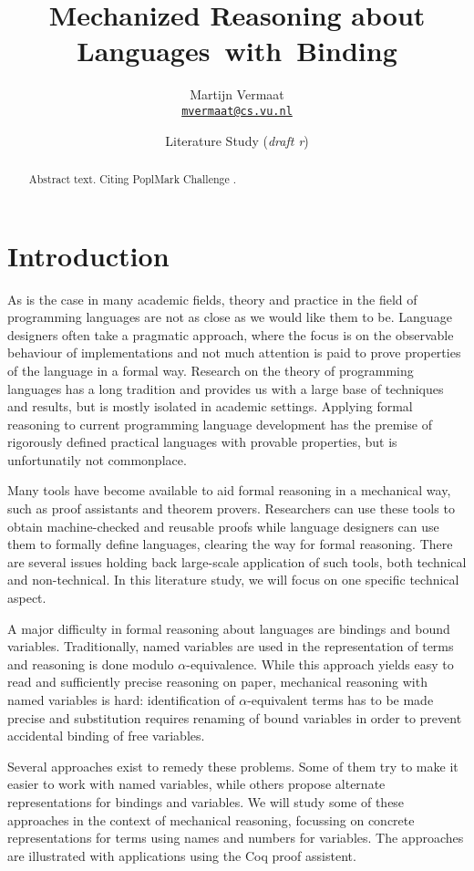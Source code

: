 \documentclass[a4paper,11pt]{article}
\title{Mechanized Reasoning about Languages~with~Binding}
\author{
  Martijn Vermaat\\[0.3em]
  \href{mailto:mvermaat@cs.vu.nl}{\texttt{mvermaat@cs.vu.nl}}
}
\date{Literature Study (\emph{draft r\svnrev})}
\begin{document}
\maketitle


\begin{abstract}
  Abstract text. Citing PoplMark Challenge \cite{Poplmark-Challenge-05}.
\end{abstract}


\section{Introduction}\label{sec:introduction}

As is the case in many academic fields, theory and practice in the field
of programming languages are not as close as we would like them to be.
Language designers often take a pragmatic approach, where the focus is
on the observable behaviour of implementations and not much attention
is paid to prove properties of the language in a formal way.
Research on the theory of programming languages has a long tradition and
provides us with a large base of techniques and results, but is mostly
isolated in academic settings.
Applying formal reasoning to current programming language development
has the premise of rigorously defined practical languages with provable
properties, but is unfortunatily not commonplace.

Many tools have become available to aid formal reasoning in a mechanical
way, such as proof assistants and theorem provers.
Researchers can use these tools to obtain machine-checked and reusable
proofs while language designers can use them to formally define languages,
clearing the way for formal reasoning.
There are several issues holding back large-scale application of such
tools, both technical and non-technical. In this literature study, we will
focus on one specific technical aspect.

A major difficulty in formal reasoning about languages are bindings and
bound variables.
Traditionally, named variables are used in the representation of terms
and reasoning is done modulo $\alpha$-equivalence.
While this approach yields easy to read and sufficiently precise
reasoning on paper,
mechanical reasoning with named variables is hard:
identification of $\alpha$-equivalent terms has to be made precise and
substitution requires renaming of bound variables in order to prevent
accidental binding of free variables.

Several approaches exist to remedy these problems.
Some of them try to make it easier to work with named variables, while
others propose alternate representations for bindings and variables.
We will study some of these approaches in the context of mechanical
reasoning, focussing on concrete representations for terms using names
and numbers for variables.
The approaches are illustrated with applications using the Coq proof
assistent.
\end{document}
